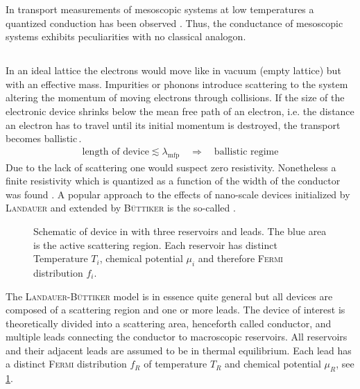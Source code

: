 In transport measurements of mesoscopic systems at low temperatures a quantized conduction has been observed \cite{PhysRevLett.45.494}. Thus, the conductance of mesoscopic systems exhibits peculiarities with no classical analogon.
\subsection{\clanbform{}}\label{sec:landauerbuettiker}
In an ideal lattice the electrons would move like in vacuum (empty lattice) but with an effective mass. Impurities or phonons introduce scattering to the system altering the momentum of moving electrons through collisions.
If the size of the electronic device shrinks below the mean free path of an electron, i.e. the distance an electron has to travel until its initial momentum is destroyed, the transport becomes ballistic\,\cite{datta1989quantum}. 
\begin{align}
	\text{length of device} \lesssim \lambda_{\text{mfp}}\quad \Rightarrow \quad\text{ballistic regime}
	\label{eqn:meanfreepath}
\end{align}
Due to the lack of scattering one would suspect zero resistivity. Nonetheless a finite resistivity which is quantized as a function of the width of the conductor was found \cite{PhysRevLett.60.848}.
A popular approach to the effects of nano-scale devices initialized by \textsc{Landauer} \cite{PhilMag.21.863} and extended by \textsc{B\"uttiker} is the so-called \lanbform{} \cite{PhysRevB.31.6207}.
\begin{figure}[h]
\centering
{}
\caption{Schematic of device in \lanbform{} with three reservoirs and leads. The blue area is the active scattering region. Each reservoir has distinct Temperature $T_i$, chemical potential $\mu_i$ and therefore \textsc{Fermi} distribution $f_i$.}
\label{fig:lanbform}
\end{figure}
The \textsc{Landauer-B\"uttiker} model is in essence quite general but all devices are composed of a scattering region and one or more leads. The device of interest is theoretically divided into a scattering area, henceforth called conductor, and multiple leads connecting the conductor to macroscopic reservoirs. All reservoirs and their adjacent leads are assumed to be in thermal equilibrium. Each lead has a distinct \textsc{Fermi} distribution $f_R$ of temperature $T_R$ and chemical potential $\mu_R$, see \cref{fig:lanbform}.

